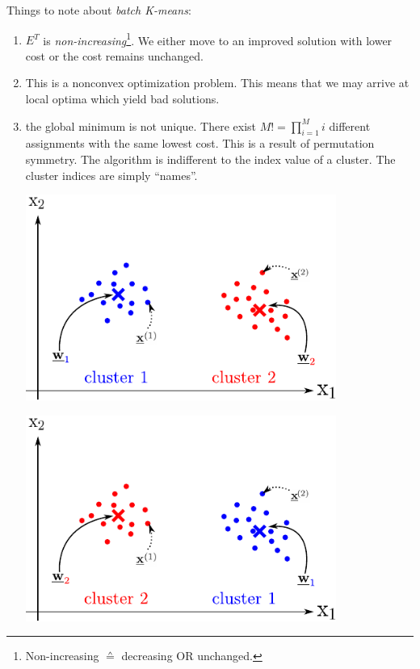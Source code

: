\begin{frame}
Things to note about \emph{batch K-means}:

\begin{enumerate}
\item $E^T$ is \emph{non-increasing}\footnote{Non-increasing $\corresponds$ decreasing OR unchanged.}. We either move to an improved solution with lower cost or the cost remains unchanged.
\item This is a nonconvex optimization problem. This means that we may arrive at local optima which yield bad solutions.
\item {}the global minimum is not unique. There exist $M! = \prod_{i=1}^{M} i$ different assignments with the same lowest cost. This is a result of permutation symmetry. 
The algorithm is indifferent to the index value of a cluster. The cluster indices are simply ``names''.
\begin{center}
\begin{minipage}{0.45\textwidth}
	\includegraphics[width=0.8\textwidth]{img/clustering_color_proto}
\end{minipage}
\begin{minipage}{0.45\textwidth}
	\includegraphics[width=0.8\textwidth]{img/clustering_color_proto_swap}
\end{minipage}
\end{center}
 
\end{enumerate}

\end{frame}

